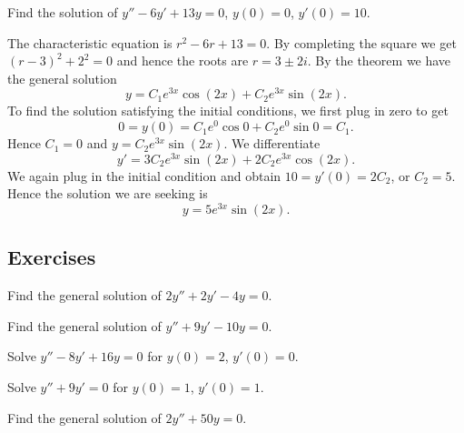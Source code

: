 \begin{example}
Find the solution of $y'' - 6 y' + 13 y = 0$, $y(0) = 0$, $y'(0) =
10$.

The characteristic equation is $r^2 - 6 r + 13 = 0$.  By completing the
square we get ${(r-3)}^2 + 2^2 = 0$ and hence the roots are
$r = 3 \pm 2i$.
By the theorem we have the general solution
\begin{equation*}
y = C_1 e^{3x} \cos (2x) + C_2 e^{3x} \sin (2x) .
\end{equation*}
To find the solution satisfying the initial conditions, we first plug in zero
to get
\begin{equation*}
0 = y(0) = C_1 e^{0} \cos 0 + C_2 e^{0} \sin 0  = C_1 .
\end{equation*}
Hence $C_1 = 0$ and $y = C_2 e^{3x} \sin (2x)$.  We differentiate
\begin{equation*}
y' = 3C_2 e^{3x} \sin (2x) + 2C_2 e^{3x} \cos (2x) .
\end{equation*}
We again plug in the initial condition and obtain $10 = y'(0) = 2C_2$, or
$C_2 = 5$.  Hence the solution we are seeking is
\begin{equation*}
y = 5 e^{3x} \sin (2x) .
\end{equation*}
\end{example}

\subsection{Exercises}

\begin{exercise}
Find the general solution of $2y'' + 2y' -4 y = 0$.
\end{exercise}

\begin{exercise}
Find the general solution of $y'' + 9y' - 10 y = 0$.
\end{exercise}

\begin{exercise}
Solve $y'' - 8y' + 16 y = 0$ for $y(0) = 2$, $y'(0) = 0$.
\end{exercise}

\begin{exercise}
Solve $y'' + 9y' = 0$ for $y(0) = 1$, $y'(0) = 1$.
\end{exercise}

\begin{exercise}
Find the general solution of $2y'' + 50y = 0$.
\end{exercise}

